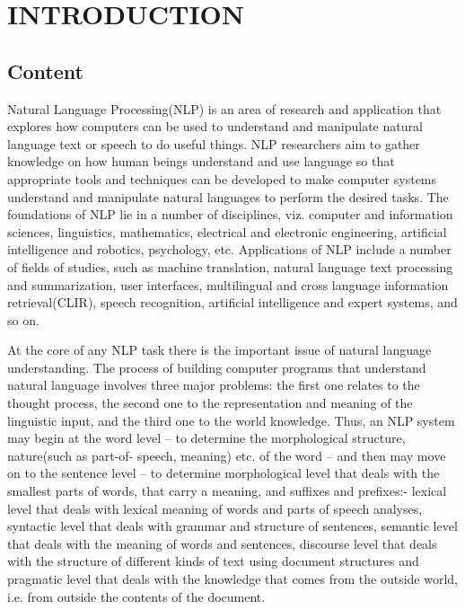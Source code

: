 \documentclass[12pt,a4paper,oldfontcommands]{memoir}
\begin{document}
\newpage


\tableofcontents*

\newpage
\listoffigures
\newpage
\listoftables
\clearpage





\chapter{INTRODUCTION}

\section{Content}
Natural Language Processing(NLP) is an area of research and application that explores how computers can be used to understand and manipulate natural language text or speech to do useful things. NLP researchers aim to gather knowledge on how human beings understand and use language so that appropriate tools and techniques can be developed to make computer systems understand and manipulate natural languages to perform the desired tasks. The foundations of NLP lie in a number of disciplines, viz. computer and information sciences, linguistics, mathematics, electrical and electronic engineering, artificial intelligence and robotics, psychology, etc. Applications of NLP include a number of fields of studies, such as machine translation, natural language text processing and summarization, user interfaces, multilingual and cross language information retrieval(CLIR), speech recognition, artificial intelligence and expert systems, and so on\cite{1}.

At the core of any NLP task there is the important issue of natural language understanding. The process of building computer programs that understand natural language involves three major problems: the first one relates to the thought process, the second one to the representation and meaning of the linguistic input, and the third one to the world knowledge. Thus, an NLP system may begin at the word level – to determine the morphological structure, nature(such as part-of- speech, meaning) etc. of the word – and then may move on to the sentence level – to determine morphological level that deals with the smallest parts of words, that carry a meaning, and suffixes and prefixes:-  lexical level that deals with lexical meaning of words and parts of speech analyses, syntactic level that deals with grammar and structure of sentences, semantic level that deals with the meaning of words and sentences, discourse level that deals with the structure of different kinds of text using document structures and pragmatic level that deals with the knowledge that comes from the outside world, i.e. from outside the contents of the document.
\end{document}
